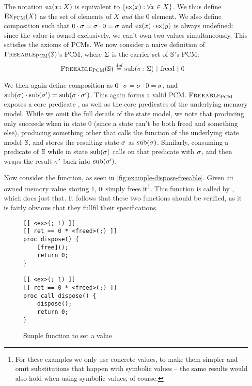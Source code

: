 The notation $\text{ex}(x\colon X)$ is equivalent to $\{ \text{ex}(x) : \forall x\in X \}$. We thus define $\textsc{Ex}_{\textsc{PCM}}(X)$ as the set of elements of $X$ \emph{and} the $0$ element. We also define composition such that $0\cdot \sigma=\sigma\cdot 0=\sigma$ and $\text{ex}(x) \cdot \text{ex}(y)$ is always undefined: since the value is owned exclusively, we can't own two values simultaneously. This satisfies the axioms of PCMs. We now consider a naive definition of $\textsc{Freeable}_{\textsc{PCM}}(\mathbb S)$'s PCM, where $\Sigma$ is the carrier set of $\mathbb S$'s PCM:
\begin{align*}
	\textsc{Freeable}_{\textsc{PCM}}(\mathbb S) &\stackrel{\textnormal{def}}= \text{sub}(\sigma\colon \Sigma) ~|~ \text{freed} ~|~ 0
\end{align*}

We then again define composition as $0 \cdot \sigma=\sigma \cdot 0=\sigma$, and $\text{sub}(\sigma) \cdot \text{sub}(\sigma')=\text{sub}(\sigma\cdot \sigma')$. This again forms a valid PCM. $\textsc{Freeable}_{\textsc{PCM}}$ exposes a core predicate \freedP, as well as the core predicates of the underlying memory model. While we omit the full details of the state model, we note that producing \freedP{} only succeeds when in state $0$ (since a state can't be both freed and something else), producing something other that \freedP{} calls the \produce{} function of the underlying state model $\mathbb S$, and stores the resulting state $\sigma$ as $\text{sub}(\sigma)$. Similarly, consuming a predicate of $\mathbb S$ while in state $\text{sub}(\sigma)$ calls \consume{} on that predicate with $\sigma$, and then wraps the result $\sigma'$ back into $\text{sub}(\sigma')$.

Now consider the  function, as seen in \autoref{fig:example-dispose-freeable}. Given an owned memory value storing $1$, it simply frees it\footnote{For these examples we only use concrete values, to make them simpler and omit substitutions that happen with symbolic values -- the same results would also hold when using symbolic values, of course.}. This function is called by , which does just that. It follows that these two functions should be verified, as it is fairly obvious that they fullfil their specifications.

\begin{figure}\centering
\begin{lstlisting}
[[ <ex>(; 1) ]]
[[ ret == 0 * <freed>(;) ]]
proc dispose() {
	[free]();
	return 0;
}

[[ <ex>(; 1) ]]
[[ ret == 0 * <freed>(;) ]]
proc call_dispose() {
	dispose();
	return 0;
}
\end{lstlisting}
\caption{Simple function to set a value}
\label{fig:example-dispose-freeable}
\end{figure}

